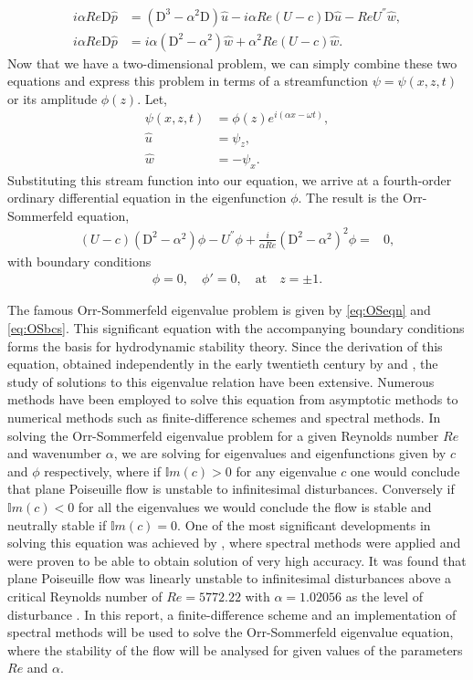 \documentclass[a4paper, 12pt, twoside, openright]{article}
\numberwithin{equation}{section}
\begin{document}
\begin{align}
i\alpha Re \mathrm{D}\hat p &=  (\mathrm{D}^3 - \alpha^2 \mathrm{D})\hat u - i\alpha Re(U-c)\mathrm{D}\hat u - Re U^{''}\hat w,\\  
i\alpha Re\mathrm{D}\hat p &= i\alpha(\mathrm{D}^2 - \alpha^2)\hat w + \alpha^2 Re(U-c)\hat w. 
\end{align}
Now that we have a two-dimensional problem, we can simply combine these two equations and express this problem in terms of a streamfunction $\psi = \psi(x,z,t)$ or its amplitude $\phi(z)$. Let, 
\begin{align}
\psi(x,z,t) &= \phi(z) e^{i(\alpha x-\omega t)},\\
\hat u &=\psi_z, \\
\hat w &=-\psi_x.
\end{align}
Substituting this stream function into our equation, we arrive at a fourth-order ordinary differential equation in the eigenfunction $\phi$. The result is the Orr-Sommerfeld equation,
\begin{align}
\left(U-c\right)\left(\mathrm{D}^2 - \alpha^2\right)\phi  - U^{''}\phi + \frac{i}{\alpha Re} \left(\mathrm{D}^2 - \alpha^2\right)^2 \phi =& 0,\label{eq:OSeqn}
\end{align}
with boundary conditions 
\begin{align}
\phi=0, \quad \phi'=0, \quad \text{at} \quad z=\pm1.\label{eq:OSbcs}
\end{align}

The famous Orr-Sommerfeld eigenvalue problem is given by \eqref{eq:OSeqn} and \eqref{eq:OSbcs}. This significant equation with the accompanying boundary conditions forms the basis for hydrodynamic stability theory. Since the derivation of this equation, obtained independently in the early twentieth century by \cite{Orr07a,Orr07b} and \cite{Sommerfeld08}, the study of solutions to this eigenvalue relation have been extensive. Numerous methods have been employed to solve this equation from asymptotic methods to numerical methods such as finite-difference schemes and spectral methods. In solving the Orr-Sommerfeld eigenvalue problem for a given Reynolds number $Re$ and wavenumber $\alpha$, we are solving for eigenvalues and eigenfunctions given by $c$ and $\phi$ respectively, where if $\mathbb{I}m(c)>0$ for any eigenvalue $c$ one would conclude that plane Poiseuille flow is unstable to infinitesimal disturbances. Conversely if $\mathbb{I}m(c)<0$ for all the eigenvalues we would conclude the flow is stable and neutrally stable if $\mathbb{I}m(c)=0$. One of the most significant developments in solving this equation was achieved by \cite{Orszag71}, where spectral methods were applied and were proven to be able to obtain solution of very high accuracy. It was found that plane Poiseuille flow was linearly unstable to infinitesimal disturbances above a critical Reynolds number of $Re=5772.22$ with $\alpha=1.02056$ as the level of disturbance \citep{Orszag71}. In this report, a finite-difference scheme and an implementation of spectral methods will be used to solve the Orr-Sommerfeld eigenvalue equation, where the stability of the flow will be analysed for given values of the parameters $Re$ and $\alpha$. 
\end{document}
